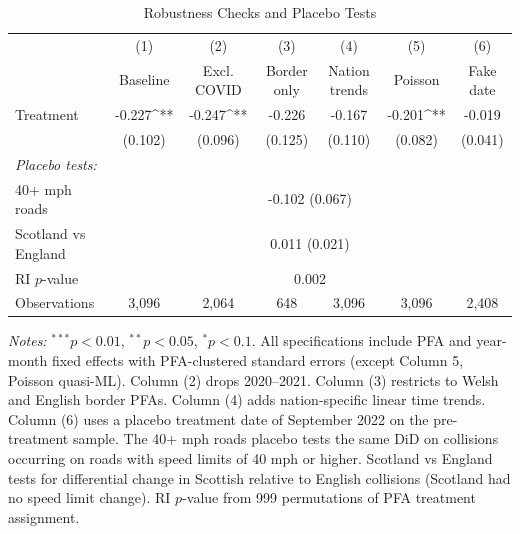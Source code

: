 \begin{table}[htbp]
\centering
\caption{Robustness Checks and Placebo Tests}
\label{tab:robustness}
\begin{adjustbox}{max width=\textwidth}
\begin{tabular}{lcccccc}
\hline\hline
 & (1) & (2) & (3) & (4) & (5) & (6) \\
 & Baseline & Excl. COVID & Border only & Nation trends & Poisson & Fake date \\
\hline
Treatment & -0.227^{**} & -0.247^{**} & -0.226 & -0.167 & -0.201^{**} & -0.019 \\
 & (0.102) & (0.096) & (0.125) & (0.110) & (0.082) & (0.041) \\
\hline
\multicolumn{7}{l}{\textit{Placebo tests:}} \\
40+ mph roads & \multicolumn{6}{c}{-0.102 (0.067)} \\
Scotland vs England & \multicolumn{6}{c}{0.011 (0.021)} \\
RI $p$-value & \multicolumn{6}{c}{0.002} \\
\hline
Observations & 3,096 & 2,064 & 648 & 3,096 & 3,096 & 2,408 \\
\hline\hline
\end{tabular}
\end{adjustbox}
\smallskip
\begin{minipage}{\textwidth}
\footnotesize
\textit{Notes:} $^{***}p<0.01$, $^{**}p<0.05$, $^{*}p<0.1$. All specifications include PFA and year-month fixed effects with PFA-clustered standard errors (except Column 5, Poisson quasi-ML). Column (2) drops 2020--2021. Column (3) restricts to Welsh and English border PFAs. Column (4) adds nation-specific linear time trends. Column (6) uses a placebo treatment date of September 2022 on the pre-treatment sample. The 40+ mph roads placebo tests the same DiD on collisions occurring on roads with speed limits of 40 mph or higher. Scotland vs England tests for differential change in Scottish relative to English collisions (Scotland had no speed limit change). RI $p$-value from 999 permutations of PFA treatment assignment.
\end{minipage}
\end{table}
